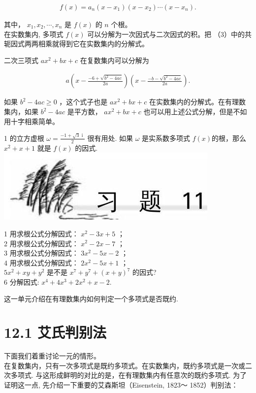 \documentclass[10pt]{article}
\begin{document}
\begin{align*}
f(x)=a_{n}\left(x-x_{1}\right)\left(x-x_{2}\right) \cdots\left(x-x_{n}\right) . \tag{3}
\end{align*}

其中， $x_{1}, x_{2}, \cdots, x_{n}$ 是 $f(x)$ 的 $n$ 个根。\\
在实数集内, 多项式 $f(x)$ 可以分解为一次因式与二次因式的积。把 （3）中的共轭因式两两相乘就得到它在实数集内的分解式。

二次三项式 $a x^{2}+b x+c$ 在复数集内可以分解为

\begin{align*}
a\left(x-\frac{-6+\sqrt{b^{2}-4 a c}}{2 a}\right)\left(x-\frac{-b-\sqrt{b^{2}-4 a c}}{2 a}\right) .
\end{align*}

如果 $b^{2}-4 a c \geqslant 0$ ，这个式子也是 $a x^{2}+b x+c$ 在实数集内的分解式。在有理数集内，如果 $b^{2}-4 a c$ 是平方数， $a x^{2}+b x+c$ 也可以用上述公式分解，但是不如用十字相乘简单。

1 的立方虚根 $\omega=\frac{-1+\sqrt{3} \text { i }}{2}$ 很有用处. 如果 $\omega$ 是实系数多项式 $f(x)$的根，那么 $x^{2}+x+1$ 就是 $f(x)$ 的因式.\\
\includegraphics[max width=\textwidth, center]{2024_10_30_bd799899fef40368a068g-091}

1 用求根公式分解因式： $x^{2}-3 x+5$ ；\\
2 用求根公式分解因式： $x^{2}-2 x-7$ ；\\
3 用求根公式分解因式： $3 x^{2}-5 x-2$ ；\\
4 用求根公式分解因式： $2 x^{2}-5 x+1$ ；\\
$5 x^{2}+x y+y^{2}$ 是不是 $x^{7}+y^{7}+(x+y)^{7}$ 的因式?\\
6 分解因式: $x^{4}+4 x^{3}+2 x^{2}+x-2$.

这一单元介绍在有理数集内如何判定一个多项式是否既约.

\section*{12.1 艾氏判别法}
下面我们着重讨论一元的情形。\\
在复数集内，只有一次多项式是既约多项式。在实数集内，既约多项式是一次或二次多项式. 与这形成鲜明的对比的是，在有理数集内有任意次的既约多项式. 为了证明这一点, 先介绍一下重要的艾森斯坦（Eisenstein, 1823～ 1852）判别法：
\end{document}
